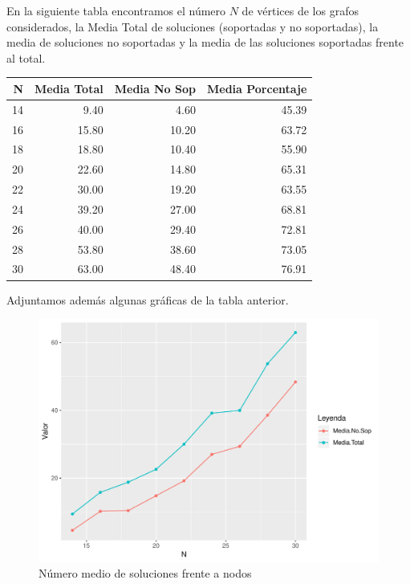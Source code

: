 \documentclass[twoside,a4paper,openright,12pt]{book}
\begin{document}
En la siguiente tabla encontramos el número $N$ de vértices de los grafos considerados, la Media Total de soluciones (soportadas y no soportadas), la media de soluciones no soportadas y la media de las soluciones soportadas frente al total.
\begin{table}[ht]
\centering
\begin{tabular}{rrrr}
  \hline
N & Media Total & Media No Sop & Media Porcentaje \\ 
  \hline
  14 & 9.40 & 4.60 & 45.39 \\ 
  16 & 15.80 & 10.20 & 63.72 \\ 
  18 & 18.80 & 10.40 & 55.90 \\ 
  20 & 22.60 & 14.80 & 65.31 \\ 
  22 & 30.00 & 19.20 & 63.55 \\ 
  24 & 39.20 & 27.00 & 68.81 \\ 
  26 & 40.00 & 29.40 & 72.81 \\ 
  28 & 53.80 & 38.60 & 73.05 \\ 
  30 & 63.00 & 48.40 & 76.91 \\ 
   \hline
\end{tabular}
\end{table}

Adjuntamos además algunas gráficas de la tabla anterior.

\begin{figure}[h!]
\centering
\includegraphics[scale=0.7]{plot10}
\caption{Número medio de soluciones frente a nodos}
\end{figure}
\end{document}
